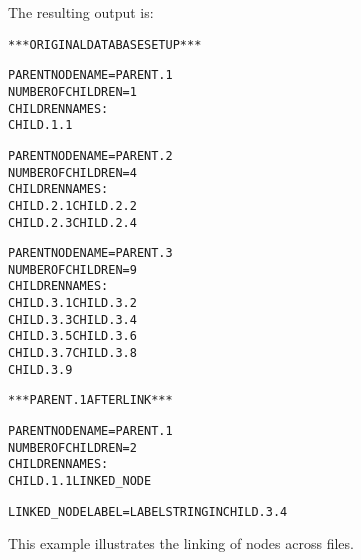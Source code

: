\noindent
The resulting output is:

\begin{alltt}
   *** ORIGINAL DATABASE SETUP ***

   PARENT NODE NAME = PARENT.1
       NUMBER OF CHILDREN =  1
       CHILDREN NAMES:
          CHILD.1.1

   PARENT NODE NAME = PARENT.2
       NUMBER OF CHILDREN =  4
       CHILDREN NAMES:
          CHILD.2.1                       CHILD.2.2
          CHILD.2.3                       CHILD.2.4

   PARENT NODE NAME = PARENT.3
       NUMBER OF CHILDREN =  9
       CHILDREN NAMES:
          CHILD.3.1                       CHILD.3.2
          CHILD.3.3                       CHILD.3.4
          CHILD.3.5                       CHILD.3.6
          CHILD.3.7                       CHILD.3.8
          CHILD.3.9

   *** PARENT.1 AFTER LINK ***

   PARENT NODE NAME = PARENT.1
       NUMBER OF CHILDREN =  2
       CHILDREN NAMES:
          CHILD.1.1                       LINKED_NODE

   LINKED_NODE LABEL = LABEL STRING IN CHILD.3.4
\end{alltt}


This example illustrates the linking of nodes across files.


